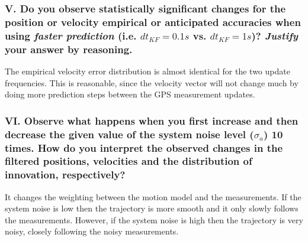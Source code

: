 \documentclass{article}
\begin{document}
\subsubsection*{V. Do you observe statistically significant changes for the position or velocity
empirical or anticipated accuracies when using \textit{faster prediction} (i.e. $dt_{KF}=0.1s$ vs.
$dt_{KF}=1s$)? \textit{Justify} your answer by reasoning.}

The empirical velocity error distribution is almost identical for the two update frequencies.
This is reasonable, since the velocity vector will not change much by doing more prediction steps between the GPS measurement updates.

\subsubsection*{VI. Observe what happens when you first increase and then decrease the given value of
the system noise level ($\sigma_{\dot a}$) 10 times. How do you interpret the observed changes
in the filtered positions, velocities and the distribution of innovation, respectively?}

It changes the weighting between the motion model and the measurements.
If the system noise is low then the trajectory is more smooth and it only slowly follows the measurements.
However, if the system noise is high then the trajectory is very noisy, closely following the noisy measurements.
\end{document}
